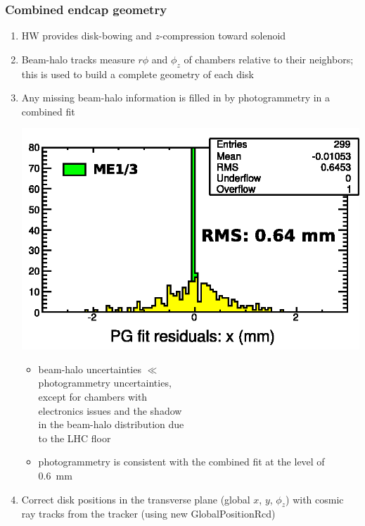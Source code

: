 \documentclass[compress]{beamer}
\begin{document}
\begin{frame}
\frametitle{Combined endcap geometry}
\begin{enumerate}
\item HW provides disk-bowing and $z$-compression toward solenoid
\item Beam-halo tracks measure $r\phi$ and $\phi_z$ of chambers
  relative to their neighbors; this is used to build a complete
  geometry of each disk
\item Any missing beam-halo information is filled in by photogrammetry
  in a combined fit

\hfill \includegraphics[width=0.4\linewidth]{beamhalo-PG.png}

\vspace{-2.8 cm}
\begin{itemize}
\item beam-halo uncertainties $\ll$ \\ photogrammetry uncertainties, \\
  except for chambers with \\ electronics issues and the shadow \\ in the
  beam-halo distribution due \\ to the LHC floor
\item photogrammetry is consistent with the combined fit at the level of 0.6~mm
\end{itemize}

\item Correct disk positions in the transverse plane (global $x$, $y$,
  $\phi_z$) with cosmic ray tracks from the tracker (using new GlobalPositionRcd)
\end{enumerate}
\end{frame}

\end{document}
